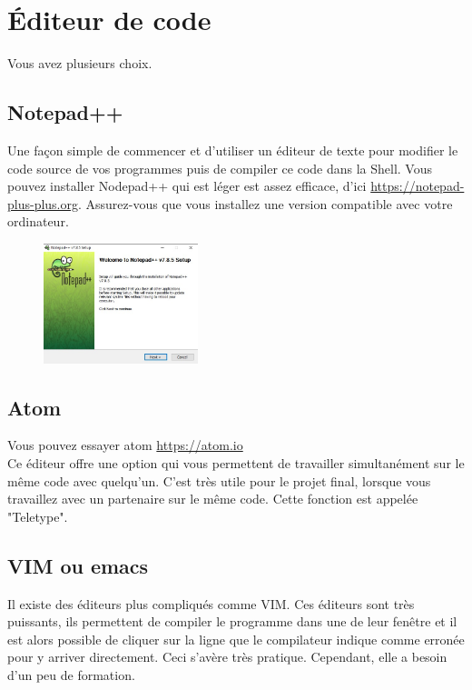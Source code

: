\documentclass{article}
\begin{document}
\section{Éditeur de code\label{S:Editor}}
Vous avez plusieurs choix.
\subsection{Notepad++}
Une façon simple de commencer et d’utiliser un éditeur de texte pour modifier le code source de vos programmes puis de compiler ce code dans la Shell. Vous pouvez installer Nodepad++ qui est léger est assez efficace, d'ici \href{https://notepad-plus-plus.org}{https://notepad-plus-plus.org}. Assurez-vous que vous installez une version compatible avec votre ordinateur.
\begin{figure}[H]
\center
\includegraphics[width=0.4\textwidth]{Plots/Editor_1.jpg}
\end{figure}
\subsection{Atom\label{S:VisCodAtom}}
Vous pouvez essayer atom \href{https://atom.io}{https://atom.io}\\

Ce éditeur offre une option qui vous permettent de travailler simultanément sur le même code avec quelqu'un. C'est très utile pour le projet final, lorsque vous travaillez avec un partenaire sur le même code. Cette fonction est appelée "Teletype".
\subsection{VIM ou emacs}
Il existe des éditeurs plus compliqués comme VIM. Ces éditeurs sont très puissants, ils permettent de compiler le programme dans une de leur fenêtre et il est alors possible de cliquer sur la ligne que le compilateur indique comme erronée pour y arriver directement. Ceci s’avère très pratique. Cependant, elle a besoin d'un peu de formation.
\end{document}
